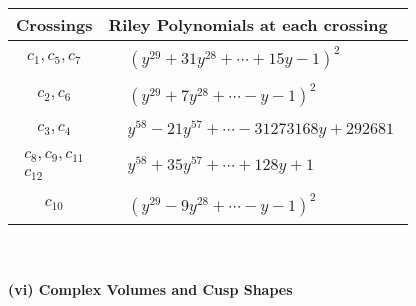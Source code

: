 \documentclass[1p]{elsarticle_modified}
\theoremstyle{definition}
\begin{document}
\begin{tabular}{m{50pt}|m{274pt}}
Crossings & \hspace{64pt}Riley Polynomials at each crossing \\
\hline $$\begin{aligned}c_{1},c_{5},c_{7}\end{aligned}$$&$\begin{aligned}
&(y^{29}+31 y^{28}+\cdots+15 y-1)^{2}
\end{aligned}$\\
\hline $$\begin{aligned}c_{2},c_{6}\end{aligned}$$&$\begin{aligned}
&(y^{29}+7 y^{28}+\cdots- y-1)^{2}
\end{aligned}$\\
\hline $$\begin{aligned}c_{3},c_{4}\end{aligned}$$&$\begin{aligned}
&y^{58}-21 y^{57}+\cdots-31273168 y+292681
\end{aligned}$\\
\hline $$\begin{aligned}c_{8},c_{9},c_{11}\\c_{12}\end{aligned}$$&$\begin{aligned}
&y^{58}+35 y^{57}+\cdots+128 y+1
\end{aligned}$\\
\hline $$\begin{aligned}c_{10}\end{aligned}$$&$\begin{aligned}
&(y^{29}-9 y^{28}+\cdots- y-1)^{2}
\end{aligned}$\\
\hline
\end{tabular}\\~\\
\newpage\flushleft \textbf{(vi) Complex Volumes and Cusp Shapes}
\end{document}

